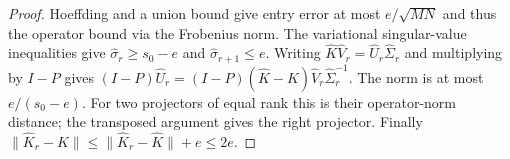 \begin{proof}
Hoeffding and a union bound give entry error at most
$e/\sqrt{MN}$ and thus the operator bound via the Frobenius norm.
The variational singular-value inequalities give
$\widehat\sigma_r\ge s_0-e$ and
$\widehat\sigma_{r+1}\le e$.
Writing $\widehat K\widehat V_r=\widehat U_r\widehat\Sigma_r$
and multiplying by $I-P$ gives
$(I-P)\widehat U_r=(I-P)(\widehat K-K)\widehat V_r
\widehat\Sigma_r^{-1}$. The norm is at most $e/(s_0-e)$.
For two projectors of equal rank this is their operator-norm distance;
the transposed argument gives the right projector. Finally
$\|\widehat K_r-K\|\le\|\widehat K_r-\widehat K\|+e\le2e$.
\end{proof}
